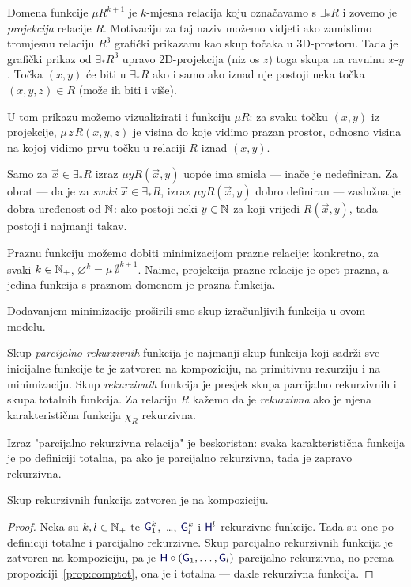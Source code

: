 Domena funkcije $\mu R^{k+1}$ je $k$-mjesna relacija koju označavamo s $\exists_*R$ i zovemo je \emph{projekcija} relacije $R$. Motivaciju za taj naziv možemo vidjeti ako zamislimo tromjesnu relaciju $R^3$ grafički prikazanu kao skup točaka u 3D-prostoru. Tada je grafički prikaz od $\exists_*R^3$ upravo 2D-projekcija (niz os $z$) toga skupa na ravninu $x$-$y$. Točka $(x,y)$ će biti u $\exists_*R$ ako i samo ako iznad nje postoji neka točka $(x,y,z)\in R$ (može ih biti i više).

U tom prikazu možemo vizualizirati i funkciju $\mu R$: za svaku točku $(x,y)$ iz projekcije, $\mu\mspace{2mu}z\mspace{2mu}R(x,y,z)$ je visina do koje vidimo prazan prostor, odnosno visina na kojoj vidimo prvu točku u relaciji $R$ iznad $(x,y)$. 

Samo za $\vec x\in\exists_*R$ izraz $\mu yR(\vec x,y)$ uopće ima smisla --- inače je nedefiniran. Za obrat --- da je za \emph{svaki} $\vec x\in\exists_*R$, izraz $\mu yR(\vec x,y)$ dobro definiran --- zaslužna je dobra uređenost od ${\mathbb N}$: ako postoji neki $y\in{\mathbb N}$ za koji vrijedi $R(\vec x,y)$, tada postoji i najmanji takav.

\begin{primjer}[{name=[prazna funkcija minimizacijom]}]\label{pr:varnothingprek}
Praznu funkciju možemo dobiti minimizacijom prazne relacije: konkretno, za svaki $k\in{\mathbb N}_+$, $\varnothing^k=\mu\,\emptyset^{k+1}$. Naime, projekcija prazne relacije je opet prazna, a jedina funkcija s praznom domenom je prazna funkcija.
\end{primjer}

Dodavanjem minimizacije proširili smo skup izračunljivih funkcija u ovom modelu.

\begin{definicija}[{name=[(parcijalno) rekurzivne funkcije i relacije]}]\label{def:parcrek}
Skup \emph{parcijalno rekurzivnih} funkcija je najmanji skup funkcija koji sadrži sve inicijalne funkcije te je zatvoren na kompoziciju, na primitivnu rekurziju i na minimizaciju. Skup \emph{rekurzivnih} funkcija je presjek skupa parcijalno rekurzivnih i skupa totalnih funkcija. Za relaciju $R$ kažemo da je \emph{rekurzivna} ako je njena karakteristična funkcija $\chi_R$ rekurzivna.
\end{definicija}

Izraz "parcijalno rekurzivna relacija" je beskoristan: svaka karakteristična funkcija je po definiciji totalna, pa ako je parcijalno rekurzivna, tada je zapravo rekurzivna.

\begin{lema}[{name=[zatvorenost skupa rekurzivnih funkcija na kompoziciju]}]\label{lm:comprek}
Skup rekurzivnih funkcija zatvoren je na kompoziciju.
\end{lema}
\begin{proof}
Neka su $k,l\in{\mathbb N}_+$ te $\f G_1^k$,~\ldots, $\f G_l^k$ i $\f H^l$ rekurzivne funkcije. Tada su one po definiciji totalne i parcijalno rekurzivne. Skup parcijalno rekurzivnih funkcija je zatvoren na kompoziciju, pa je $\f H\circ(\f G_1,\dotsc,\f G_l)$ parcijalno rekurzivna, no prema propoziciji~\ref{prop:comptot}, ona je i totalna --- dakle rekurzivna funkcija.
\end{proof}

